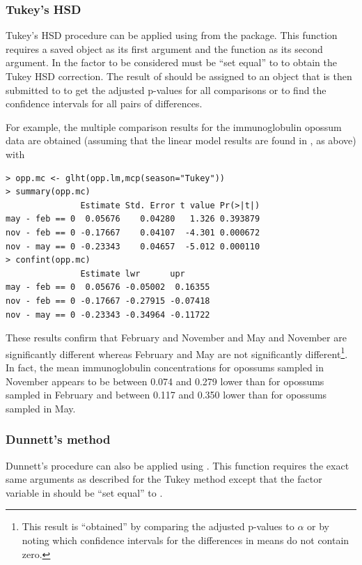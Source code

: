 \documentclass[10pt,openany]{book}\usepackage[]{graphicx}\usepackage[]{color}
\makeatletter
\newenvironment{kframe}{%
 \def\at@end@of@kframe{}%
 \ifinner\ifhmode%
  \def\at@end@of@kframe{\end{minipage}}%
  \begin{minipage}{\columnwidth}%
 \fi\fi%
 \def\FrameCommand##1{\hskip\@totalleftmargin \hskip-\fboxsep
 \colorbox{shadecolor}{##1}\hskip-\fboxsep
     \hskip-\linewidth \hskip-\@totalleftmargin \hskip\columnwidth}%
 \MakeFramed {\advance\hsize-\width
   \@totalleftmargin\z@ \linewidth\hsize
   \@setminipage}}%
 {\par\unskip\endMakeFramed%
 \at@end@of@kframe}
\newenvironment{knitrout}{}{} %
\makeatother
\begin{document}
\subsubsection*{Tukey's HSD}
Tukey's HSD procedure can be applied using  from the  package.  This function requires a saved  object as its first argument and the  function as its second argument.  In  the factor to be considered must be ``set equal'' to  to obtain the Tukey HSD correction.  The result of  should be assigned to an object that is then submitted to  to get the adjusted p-values for all comparisons or  to find the confidence intervals for all pairs of differences.

For example, the multiple comparison results for the immunoglobulin opossum data are obtained (assuming that the linear model results are found in , as above) with

\begin{knitrout}
\color{fgcolor}\begin{kframe}
\begin{verbatim}
> opp.mc <- glht(opp.lm,mcp(season="Tukey"))
> summary(opp.mc)
               Estimate Std. Error t value Pr(>|t|)
may - feb == 0  0.05676    0.04280   1.326 0.393879
nov - feb == 0 -0.17667    0.04107  -4.301 0.000672
nov - may == 0 -0.23343    0.04657  -5.012 0.000110
> confint(opp.mc)
               Estimate lwr      upr     
may - feb == 0  0.05676 -0.05002  0.16355
nov - feb == 0 -0.17667 -0.27915 -0.07418
nov - may == 0 -0.23343 -0.34964 -0.11722
\end{verbatim}
\end{kframe}
\end{knitrout}
These results confirm that February and November and May and November are significantly different whereas February and May are not significantly different\footnote{This result is ``obtained'' by comparing the adjusted p-values to $\alpha$ or by noting which confidence intervals for the differences in means do not contain zero.}.  In fact, the mean immunoglobulin concentrations for opossums sampled in November appears to be between 0.074 and 0.279 lower than for opossums sampled in February and between 0.117 and 0.350 lower than for opossums sampled in May.


\subsubsection*{Dunnett's method}
Dunnett's procedure can also be applied using .  This function requires the exact same arguments as described for the Tukey method except that the factor variable in  should be ``set equal'' to .
\end{document}
